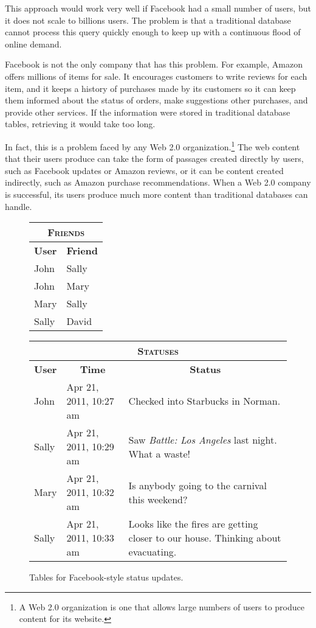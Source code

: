 This approach would work very well if Facebook had a small number of users,
but it does not scale to billions users.
The problem is that a traditional database cannot process
this query quickly enough to keep up with a continuous
flood of online demand.

Facebook is not the only company that has this problem.
For example, Amazon
offers millions of items for sale.
It encourages customers to write reviews for each item, and it keeps a history
of purchases made by its customers so it can keep them informed about the status of orders,
make suggestions other purchases, and provide other services.
If the information were stored in traditional database tables,
retrieving it would take too long.

In fact, this is a problem faced by any
Web 2.0 organization.\footnote{A
Web 2.0 organization is one that allows large numbers
of users to produce content for its website.}
The web content that their users produce
can take the form of passages created directly by users,
such as Facebook updates or Amazon reviews, or it can be content created
indirectly, such as Amazon purchase recommendations.
When a Web 2.0 company is successful,
its users produce much more content than traditional databases can handle.

\begin{figure}
	\begin{center}
		\begin{tabular}[t]{ll}
			\hline
			\multicolumn{2}{c}{\textsc{Friends}} \\
			\hline
			\multicolumn{1}{c}{\textbf{User}} & \multicolumn{1}{c}{\textbf{Friend}} \\
			\hline
			John  & Sally \\
			John  & Mary \\
			Mary  & Sally \\
			Sally & David \\
			\hline
		\end{tabular}
		\hspace{.5in}
		\begin{tabular}[t]{llp{1in}}
			\hline
			\multicolumn{3}{c}{\textsc{Statuses}} \\
			\hline
			\multicolumn{1}{c}{\textbf{User}} & \multicolumn{1}{c}{\textbf{Time}} & \multicolumn{1}{c}{\textbf{Status}} \\
			\hline
			John  & Apr 21, 2011, 10:27 am & \raggedright Checked into Starbucks in Norman. \tabularnewline
			Sally & Apr 21, 2011, 10:29 am & \raggedright Saw \emph{Battle: Los Angeles} last night.  What a waste! \tabularnewline
			Mary  & Apr 21, 2011, 10:32 am & \raggedright Is anybody going to the carnival this weekend? \tabularnewline
			Sally & Apr 21, 2011, 10:33 am & \raggedright Looks like the fires are getting closer to our house.  Thinking about evacuating. \tabularnewline
			\hline
		\end{tabular}
	\end{center}
	\caption{Tables for Facebook-style status updates.}
	\label{facebook-tables}
\end{figure}

